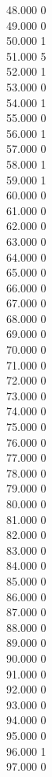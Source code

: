 { 48.000	0 \\
 49.000	0 \\
 50.000	1 \\
 51.000	5 \\
 52.000	1 \\
 53.000	0 \\
 54.000	1 \\
 55.000	0 \\
 56.000	1 \\
 57.000	0 \\
 58.000	1 \\
 59.000	1 \\
 60.000	0 \\
 61.000	0 \\
 62.000	0 \\
 63.000	0 \\
 64.000	0 \\
 65.000	0 \\
 66.000	0 \\
 67.000	0 \\
 68.000	0 \\
 69.000	0 \\
 70.000	0 \\
 71.000	0 \\
 72.000	0 \\
 73.000	0 \\
 74.000	0 \\
 75.000	0 \\
 76.000	0 \\
 77.000	0 \\
 78.000	0 \\
 79.000	0 \\
 80.000	0 \\
 81.000	0 \\
 82.000	0 \\
 83.000	0 \\
 84.000	0 \\
 85.000	0 \\
 86.000	0 \\
 87.000	0 \\
 88.000	0 \\
 89.000	0 \\
 90.000	0 \\
 91.000	0 \\
 92.000	0 \\
 93.000	0 \\
 94.000	0 \\
 95.000	0 \\
 96.000	1 \\
 97.000	0 \\
}
